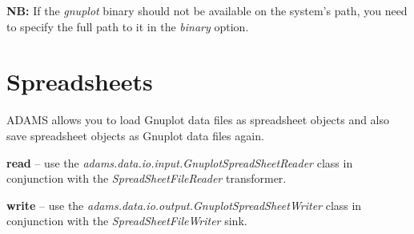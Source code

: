 \documentclass[a4paper]{book}
\begin{document}
\textbf{NB:} If the \textit{gnuplot} binary should not be available on the system's path,
you need to specify the full path to it in the \textit{binary} option.


\chapter{Spreadsheets}
ADAMS allows you to load Gnuplot data files as spreadsheet objects and also 
save spreadsheet objects as Gnuplot data files again.
\begin{tight_itemize}
	\item \textbf{read} -- use the \textit{adams.data.io.input.GnuplotSpreadSheetReader}
	class in conjunction with the \textit{SpreadSheetFileReader} transformer.
	\item \textbf{write} -- use the \textit{adams.data.io.output.GnuplotSpreadSheetWriter}
	class in conjunction with the \textit{SpreadSheetFileWriter} sink.
\end{tight_itemize}



\end{document}
